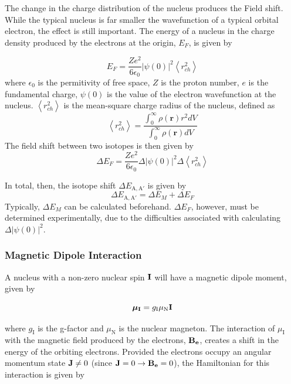 The change in the charge distribution of the nucleus produces the Field shift. While the typical nucleus is far smaller the wavefunction of a typical orbital electron, the effect is still important. The energy of a nucleus in the charge density produced by the electrons at the origin, $E_F$, is given by

\begin{equation}
E_F = \frac{Ze^2}{6 \epsilon_0}|\psi(0)|^2 \left\langle r_{ch}^2\right\rangle
\end{equation}
where $\epsilon_0$ is the permitivity of free space, $Z$ is the proton number, $e$ is the fundamental charge, $\psi(0)$ is the value of the electron wavefunction at the nucleus. $ \left\langle r_{ch}^2\right\rangle$ is the mean-square charge radius of the nucleus, defined as
\begin{equation}
 \left\langle r_{ch}^2\right\rangle = \frac{\int_0^{\infty}\rho(\mathbf{r})r^2dV}{\int_0^{\infty}\rho(\mathbf{r})dV}
\end{equation}
\noindent The field shift between two isotopes is then given by
\begin{equation}
\Delta E_F =  \frac{Ze^2}{6 \epsilon_0}\Delta|\psi(0)|^2 \Delta\left\langle r_{ch}^2\right\rangle
\end{equation}

\noindent In total, then, the isotope shift $\Delta E_{\mathrm{A,A}'}$ is given by
\begin{equation}
 \Delta E_{\mathrm{A,A'}} = \Delta E_M + \Delta E_F
\end{equation}
\noindent Typically, $\Delta E_M$ can be calculated beforehand. $ \Delta E_F$, however, must be determined experimentally, due to the difficulties associated with calculating $\Delta|\psi(0)|^2$.
\noindent \subsubsection{Magnetic Dipole Interaction}
A nucleus with a non-zero nuclear spin $\bf{I}$  will have a magnetic dipole moment, given by

\begin{equation}
\boldsymbol{\mu}_{\mathrm{\bf{I}}} = g_{\mathrm{I}}\mu_{\mathrm{N}}\mathrm{\bf{I}}
\end{equation}

\noindent where $g_{\mathrm{I}}$ is the g-factor and $\mu_{\mathrm{N}}$ is the nuclear magneton.\cite{Nut} The interaction of $\mu_{\mathrm{I}}$ with the magnetic field produced by the electrons, $\mathrm{\bf{B_e}}$, creates a shift in the energy of the orbiting electrons. Provided the electrons occupy an angular momentum state $\mathrm{\bf{J}} \neq 0$ (since $\mathrm{\bf{J}} = 0 \rightarrow \mathrm{\bf{B_e}} = 0$), the Hamiltonian for this interaction is given by

